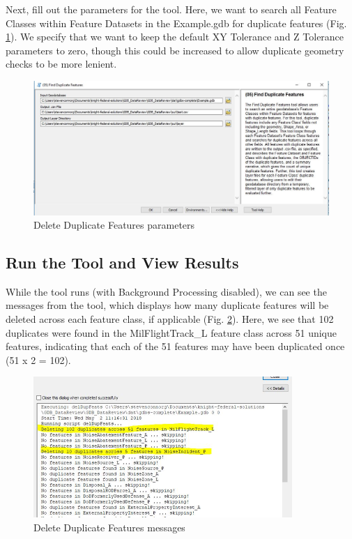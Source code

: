 \documentclass[openany]{book}
\theoremstyle{definition}
\theoremstyle{definition}
\theoremstyle{definition}
\theoremstyle{remark}
\begin{document}
Next, fill out the parameters for the tool. Here, we want to search all
Feature Classes within Feature Datasets in the Example.gdb for duplicate
features (Fig. \ref{fig:delFparams}). We specify that we want to keep
the default XY Tolerance and Z Tolerance parameters to zero, though this
could be increased to allow duplicate geometry checks to be more
lenient.

\begin{figure}[H]

{\centering \includegraphics[width=0.8\linewidth,]{figures/delF-params} 

}

\caption{Delete Duplicate Features parameters}\label{fig:delFparams}
\end{figure}

\subsection{Run the Tool and View
Results}\label{run-the-tool-and-view-results-4}

While the tool runs (with Background Processing disabled), we can see
the messages from the tool, which displays how many duplicate features
will be deleted across each feature class, if applicable (Fig.
\ref{fig:delFmessages}). Here, we see that 102 duplicates were found in
the MilFlightTrack\_L feature class across 51 unique features,
indicating that each of the 51 features may have been duplicated once
(51 x 2 = 102).

\begin{figure}[H]

{\centering \includegraphics[width=3.86in,]{figures/delF-messages} 

}

\caption{Delete Duplicate Features messages}\label{fig:delFmessages}
\end{figure}
\end{document}
